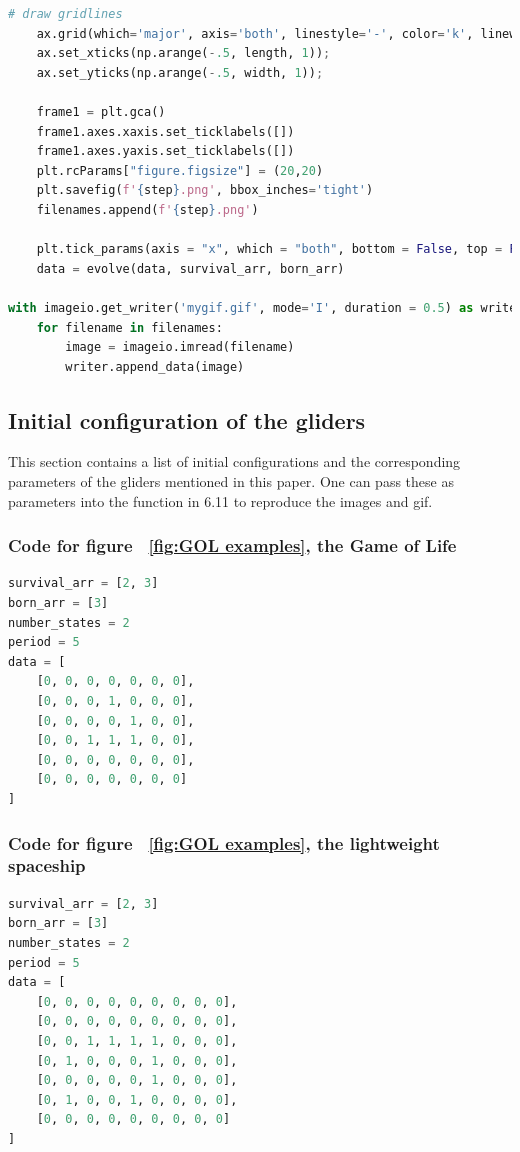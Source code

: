 \documentclass[12pt]{article}
\numberwithin{figure}{section} %
\begin{document}
\begin{lstlisting}[language = Python]
    # draw gridlines
    ax.grid(which='major', axis='both', linestyle='-', color='k', linewidth=2)
    ax.set_xticks(np.arange(-.5, length, 1));
    ax.set_yticks(np.arange(-.5, width, 1));

    frame1 = plt.gca()
    frame1.axes.xaxis.set_ticklabels([])
    frame1.axes.yaxis.set_ticklabels([])
    plt.rcParams["figure.figsize"] = (20,20)
    plt.savefig(f'{step}.png', bbox_inches='tight')
    filenames.append(f'{step}.png')
    
    plt.tick_params(axis = "x", which = "both", bottom = False, top = False)
    data = evolve(data, survival_arr, born_arr)

with imageio.get_writer('mygif.gif', mode='I', duration = 0.5) as writer:
    for filename in filenames:
        image = imageio.imread(filename)
        writer.append_data(image)
\end{lstlisting}

\subsection{Initial configuration of the gliders}
\label{subsection:Initial configuration of the gliders}
This section contains a list of initial configurations and the corresponding parameters of the gliders mentioned in this paper. One can pass these as parameters into the function in 6.11 to reproduce the images and gif. 

\subsubsection{Code for figure ~\ref{fig:GOL examples}, the Game of Life}
\label{subsubsection:GOL}
\begin{lstlisting}[language = Python]
survival_arr = [2, 3]
born_arr = [3]
number_states = 2
period = 5
data = [
    [0, 0, 0, 0, 0, 0, 0],
    [0, 0, 0, 1, 0, 0, 0],
    [0, 0, 0, 0, 1, 0, 0],
    [0, 0, 1, 1, 1, 0, 0],
    [0, 0, 0, 0, 0, 0, 0],
    [0, 0, 0, 0, 0, 0, 0]   
]
\end{lstlisting}

\subsubsection{Code for figure ~\ref{fig:GOL examples}, the lightweight spaceship}
\label{subsubsection:lightweight spaceship}
\begin{lstlisting}[language = Python]
survival_arr = [2, 3]
born_arr = [3]
number_states = 2
period = 5
data = [
    [0, 0, 0, 0, 0, 0, 0, 0, 0], 
    [0, 0, 0, 0, 0, 0, 0, 0, 0], 
    [0, 0, 1, 1, 1, 1, 0, 0, 0], 
    [0, 1, 0, 0, 0, 1, 0, 0, 0], 
    [0, 0, 0, 0, 0, 1, 0, 0, 0], 
    [0, 1, 0, 0, 1, 0, 0, 0, 0], 
    [0, 0, 0, 0, 0, 0, 0, 0, 0]
]
\end{lstlisting}
\end{document}
